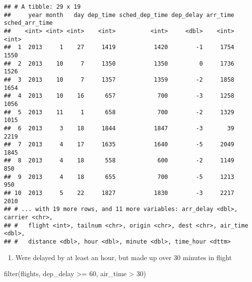 \documentclass[
]{article}
\newenvironment{Shaded}{\begin{snugshade}}{\end{snugshade}}
\newcommand{\DecValTok}[1]{\textcolor[rgb]{0.00,0.00,0.81}{#1}}
\newcommand{\FunctionTok}[1]{\textcolor[rgb]{0.00,0.00,0.00}{#1}}
\newcommand{\NormalTok}[1]{#1}
\newcommand{\SpecialCharTok}[1]{\textcolor[rgb]{0.00,0.00,0.00}{#1}}
\providecommand{\tightlist}{%
  \setlength{\itemsep}{0pt}\setlength{\parskip}{0pt}}
\begin{document}
\begin{verbatim}
## # A tibble: 29 x 19
##     year month   day dep_time sched_dep_time dep_delay arr_time sched_arr_time
##    <int> <int> <int>    <int>          <int>     <dbl>    <int>          <int>
##  1  2013     1    27     1419           1420        -1     1754           1550
##  2  2013    10     7     1350           1350         0     1736           1526
##  3  2013    10     7     1357           1359        -2     1858           1654
##  4  2013    10    16      657            700        -3     1258           1056
##  5  2013    11     1      658            700        -2     1329           1015
##  6  2013     3    18     1844           1847        -3       39           2219
##  7  2013     4    17     1635           1640        -5     2049           1845
##  8  2013     4    18      558            600        -2     1149            850
##  9  2013     4    18      655            700        -5     1213            950
## 10  2013     5    22     1827           1830        -3     2217           2010
## # ... with 19 more rows, and 11 more variables: arr_delay <dbl>, carrier <chr>,
## #   flight <int>, tailnum <chr>, origin <chr>, dest <chr>, air_time <dbl>,
## #   distance <dbl>, hour <dbl>, minute <dbl>, time_hour <dttm>
\end{verbatim}

\begin{enumerate}
\def\labelenumi{\arabic{enumi}.}
\setcounter{enumi}{5}
\tightlist
\item
  Were delayed by at least an hour, but made up over 30 minutes in
  flight
\end{enumerate}

\begin{Shaded}
\begin{Highlighting}[]
\FunctionTok{filter}\NormalTok{(flights, dep\_delay }\SpecialCharTok{\textgreater{}=} \DecValTok{60}\NormalTok{, air\_time }\SpecialCharTok{\textgreater{}} \DecValTok{30}\NormalTok{)}
\end{Highlighting}
\end{Shaded}
\end{document}

